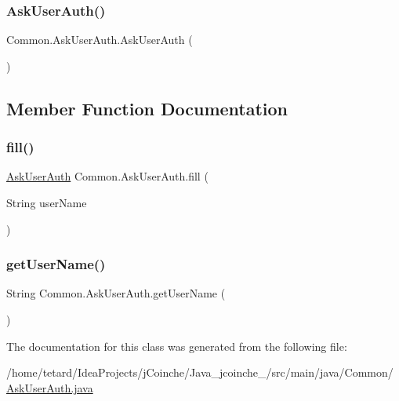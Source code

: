 \subsubsection{\texorpdfstring{Ask\+User\+Auth()}{AskUserAuth()}}
{\footnotesize\ttfamily Common.\+Ask\+User\+Auth.\+Ask\+User\+Auth (\begin{DoxyParamCaption}{ }\end{DoxyParamCaption})\hspace{0.3cm}{\ttfamily [inline]}}



\subsection{Member Function Documentation}
\mbox{\label{classCommon_1_1AskUserAuth_a1d4f4f3c59ac514089350064ef2d6aa8}} 
\subsubsection{\texorpdfstring{fill()}{fill()}}
{\footnotesize\ttfamily \mbox{\hyperlink{classCommon_1_1AskUserAuth}{Ask\+User\+Auth}} Common.\+Ask\+User\+Auth.\+fill (\begin{DoxyParamCaption}\item[{String}]{user\+Name }\end{DoxyParamCaption})\hspace{0.3cm}{\ttfamily [inline]}}

\mbox{\label{classCommon_1_1AskUserAuth_a123a0212f009ba34d8455a405cb90c0c}} 
\subsubsection{\texorpdfstring{get\+User\+Name()}{getUserName()}}
{\footnotesize\ttfamily String Common.\+Ask\+User\+Auth.\+get\+User\+Name (\begin{DoxyParamCaption}{ }\end{DoxyParamCaption})\hspace{0.3cm}{\ttfamily [inline]}}



The documentation for this class was generated from the following file\+:\begin{DoxyCompactItemize}
\item 
/home/tetard/\+Idea\+Projects/j\+Coinche/\+Java\+\_\+jcoinche\+\_/src/main/java/\+Common/\mbox{\hyperlink{AskUserAuth_8java}{Ask\+User\+Auth.\+java}}\end{DoxyCompactItemize}
